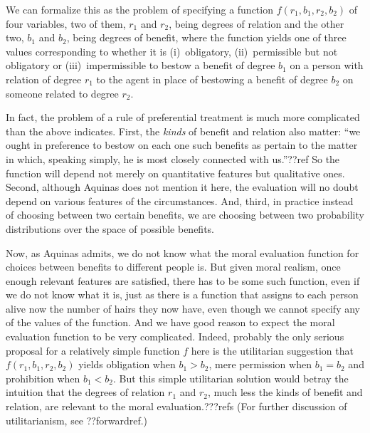 We can formalize this as the problem of specifying a function $f(r_1,b_1,r_2,b_2)$ of four variables, two of them, $r_1$ and $r_2$, being
degrees of relation and the other two, $b_1$ and $b_2$, being degrees of benefit, where the function yields one of three values
corresponding to whether it is (i)~obligatory, (ii)~permissible but not obligatory or (iii)~impermissible to bestow a benefit of degree $b_1$ on a person with
relation of degree $r_1$ to the agent in place of bestowing a benefit of degree $b_2$ on someone related to degree $r_2$. 

In fact, the problem of a rule of preferential treatment is much more complicated than the above indicates. First, the \textit{kinds} of benefit and relation also matter: ``we ought in preference 
to bestow on each one such benefits as pertain to the matter in which, speaking simply, he is most closely connected with us.''??ref
So the function will depend not merely on quantitative features but qualitative ones. Second, although Aquinas does not mention it here,
the evaluation will no doubt depend on various features of the circumstances. And, third, in practice instead of choosing between
two certain benefits, we are choosing between two probability distributions over the space of possible benefits.

Now, as Aquinas admits, we do not know what the moral evaluation function for choices between benefits to different people is.
But given moral realism, once enough relevant features are satisfied, there has to be some such function, even if we do not know what it is, just as there is a function that assigns to each person
alive now the number of hairs they now have, even though we cannot specify any of the values of the function.
And we have good reason to expect the moral evaluation function to be very complicated. Indeed, probably the only serious proposal for a
relatively simple function $f$ here is the utilitarian suggestion that $f(r_1,b_1,r_2,b_2)$ yields obligation when $b_1>b_2$,
mere permission when $b_1=b_2$ and prohibition when $b_1<b_2$. But this simple utilitarian solution would betray the intuition that
the degrees of relation $r_1$ and $r_2$, much less the kinds of benefit and relation, are relevant to the moral evaluation.???refs (For further discussion of utilitarianism, see ??forwardref.)

